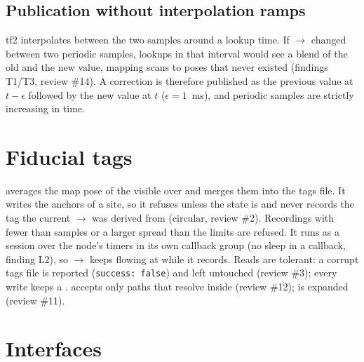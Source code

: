 \subsection{Publication without interpolation ramps}

tf2 interpolates between the two samples around a lookup time. If $\to$
changed between two periodic samples, lookups in that interval would see a blend of the old and
the new value, mapping scans to poses that never existed (findings T1/T3, review \#14). A
correction is therefore published as the previous value at $t - \epsilon$ followed by the new
value at $t$ ($\epsilon = 1$~ms), and periodic samples are strictly increasing in time.

\section{Fiducial tags}

 averages the map pose of the visible  over
 and merges them into the tags file. It writes the anchors of a
site, so it refuses unless the state is  and never records the tag the current
$\to$ was derived from (circular, review \#2). Recordings with fewer than
 samples or a larger spread than the limits are refused. It runs
as a session over the node's timers in its own callback group (no sleep in a callback, finding
L2), so $\to$ keeps flowing at  while it records. Reads are
tolerant: a corrupt tags file is reported (\texttt{success: false}) and left untouched (review
\#3); every write keeps a .  accepts only paths that resolve inside
 (review \#12); \code{~} is expanded (review \#11).

\section{Interfaces}


